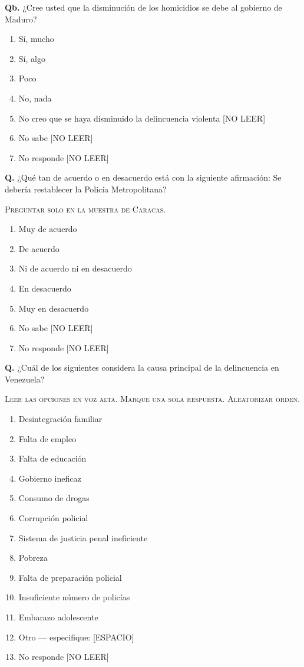 \documentclass[11pt,letterpaper]{article}
\newcounter{question}
\newcommand{\question}[1]{%
  \stepcounter{question}%
  \vspace{0.3em}%
  \noindent\textbf{Q\thequestion.} #1%
}
\newcommand{\subquestion}[2]{%
  \vspace{0.3em}%
  \noindent\textbf{Q\thequestion#1.} #2%
}
\newcommand{\instruction}[1]{%
  \vspace{0.1em}%
  \noindent\textsc{\small #1}%
  \vspace{0.1em}%
}
\newenvironment{responses}
{\begin{enumerate}[label=(\arabic*), leftmargin=2em, itemsep=0em, parsep=0em, topsep=0em]}
{\end{enumerate}\vspace{0.3em}}
\begin{document}
\subquestion{b}{¿Cree usted que la disminución de los homicidios se debe al gobierno de Maduro?}
\begin{responses}
\item Sí, mucho
\item Sí, algo
\item Poco
\item No, nada
\item No creo que se haya disminuido la delincuencia violenta [NO LEER]
\item[(98)] No sabe [NO LEER]
\item[(99)] No responde [NO LEER]
\end{responses}

\question{¿Qué tan de acuerdo o en desacuerdo está con la siguiente afirmación: Se debería restablecer la Policía Metropolitana?}

\instruction{Preguntar solo en la muestra de Caracas.}
\begin{responses}
\item Muy de acuerdo
\item De acuerdo
\item Ni de acuerdo ni en desacuerdo
\item En desacuerdo
\item Muy en desacuerdo
\item[(98)] No sabe [NO LEER]
\item[(99)] No responde [NO LEER]
\end{responses}

\question{¿Cuál de los siguientes considera la causa principal de la delincuencia en Venezuela?}

\instruction{Leer las opciones en voz alta. Marque una sola respuesta. Aleatorizar orden.}
\begin{responses}
\item Desintegración familiar
\item Falta de empleo
\item Falta de educación
\item Gobierno ineficaz
\item Consumo de drogas
\item Corrupción policial
\item Sistema de justicia penal ineficiente
\item Pobreza
\item Falta de preparación policial
\item Insuficiente número de policías
\item Embarazo adolescente
\item Otro — especifique: [ESPACIO]
\item[(99)] No responde [NO LEER]
\end{responses}
\end{document}
